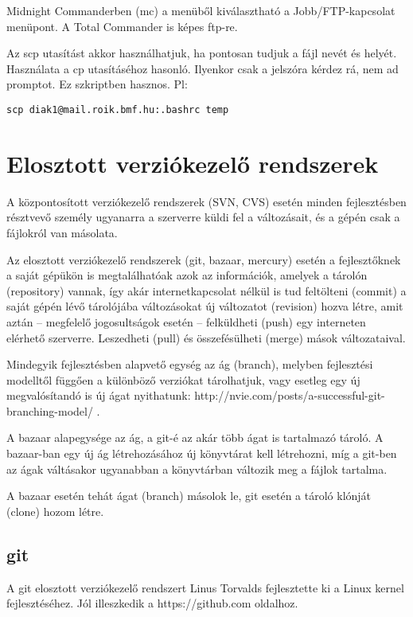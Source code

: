 \documentclass[a4paper]{article}
\begin{document}
Midnight Commanderben (mc) a menüből kiválasztható a Jobb/FTP-kapcsolat
menüpont. A Total Commander is képes ftp-re.

Az scp utasítást akkor használhatjuk, ha pontosan tudjuk a fájl nevét és
helyét.
Használata a cp utasításéhoz hasonló.  Ilyenkor csak a jelszóra kérdez
rá, nem ad promptot. Ez szkriptben hasznos. Pl:
\begin{Verbatim}
scp diak1@mail.roik.bmf.hu:.bashrc temp
\end{Verbatim}

\section{Elosztott verziókezelő rendszerek}

A központosított verziókezelő rendszerek (SVN, CVS) esetén minden
fejlesztésben résztvevő személy ugyanarra a szerverre küldi fel a
változásait, és a gépén csak a fájlokról van másolata.

Az elosztott verziókezelő rendszerek (git, bazaar, mercury) esetén a
fejlesztőknek a saját gépükön is megtalálhatóak azok az információk,
amelyek a tárolón (repository) vannak, így akár internetkapcsolat nélkül
is tud feltölteni (commit) a saját gépén lévő tárolójába változásokat új
változatot (revision) hozva létre, amit aztán -- megfelelő jogosultságok
esetén -- felküldheti (push) egy interneten elérhető szerverre.
Leszedheti (pull) és összefésülheti (merge) mások változataival.

Mindegyik fejlesztésben alapvető egység az ág (branch), melyben
fejlesztési modelltől függően a különböző verziókat tárolhatjuk, vagy
esetleg egy új megvalósítandó  is új ágat nyithatunk:
http://nvie.com/posts/a-successful-git-branching-model/ .

A bazaar alapegysége az ág, a git-é az akár több ágat is
tartalmazó tároló. A bazaar-ban egy új ág létrehozásához új könyvtárat
kell létrehozni, míg a git-ben az ágak váltásakor ugyanabban a
könyvtárban változik meg a fájlok tartalma.

A bazaar esetén tehát ágat (branch) másolok le, git esetén a tároló
klónját (clone) hozom létre.


\subsection{git}
A git elosztott verziókezelő rendszert Linus Torvalds fejlesztette ki a
Linux kernel fejlesztéséhez. Jól illeszkedik a https://github.com
oldalhoz.
\end{document}
